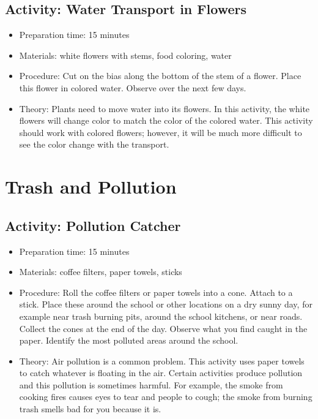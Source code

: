 \subsection{Activity: Water Transport in Flowers}
\begin{itemize}
\item{Preparation time: 15 minutes}
\item{Materials: white flowers with stems, food coloring, water}
\item{Procedure: Cut on the bias along the bottom of the stem of a flower. Place this flower in colored water. Observe over the next few days.}
\item{Theory: Plants need to move water into its flowers. In this activity, the white flowers will change color to match the color of the colored water. This activity should work with colored flowers; however, it will be much more difficult to see the color change with the transport.}
\end{itemize}

\section{Trash and Pollution}
\subsection{Activity: Pollution Catcher}
\begin{itemize}
\item{Preparation time: 15 minutes}
\item{Materials: coffee filters, paper towels, sticks}
\item{Procedure: Roll the coffee filters or paper towels into a cone. Attach to a stick. Place these around the school or other locations on a dry sunny day, for example near trash burning pits, around the school kitchens, or near roads. Collect the cones at the end of the day. Observe what you find caught in the paper. Identify the most polluted areas around the school.}
\item{Theory: Air pollution is a common problem. This activity uses paper towels to catch whatever is floating in the air. Certain activities produce pollution and this pollution is sometimes harmful. For example, the smoke from cooking fires causes eyes to tear and people to cough; the smoke from burning trash smells bad for you because it is.}
\end{itemize}

